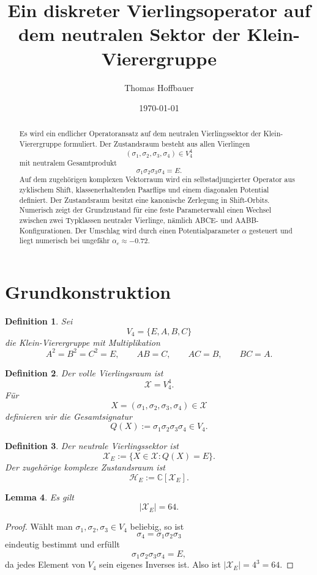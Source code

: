 \documentclass[11pt,a4paper]{article}
\title{Ein diskreter Vierlingsoperator auf dem neutralen Sektor der Klein-Vierergruppe}
\author{Thomas Hoffbauer}
\date{\today}
\newtheorem{definition}{Definition}[section]
\newtheorem{lemma}[definition]{Lemma}
\theoremstyle{remark}
\newcommand{\V}{V_4}
\newcommand{\X}{\mathcal X}
\newcommand{\XE}{\mathcal X_E}
\newcommand{\HE}{\mathcal H_E}
\begin{document}
	\maketitle
	
	\begin{abstract}
		Es wird ein endlicher Operatoransatz auf dem neutralen Vierlingssektor der Klein-Vierergruppe formuliert. Der Zustandsraum besteht aus allen Vierlingen
		\[
		(\sigma_1,\sigma_2,\sigma_3,\sigma_4)\in \V^4
		\]
		mit neutralem Gesamtprodukt
		\[
		\sigma_1\sigma_2\sigma_3\sigma_4=E.
		\]
		Auf dem zugehörigen komplexen Vektorraum wird ein selbstadjungierter Operator aus zyklischem Shift, klassenerhaltenden Paarflips und einem diagonalen Potential definiert. Der Zustandsraum besitzt eine kanonische Zerlegung in Shift-Orbits. Numerisch zeigt der Grundzustand für eine feste Parameterwahl einen Wechsel zwischen zwei Typklassen neutraler Vierlinge, nämlich ABCE- und AABB-Konfigurationen. Der Umschlag wird durch einen Potentialparameter \(\alpha\) gesteuert und liegt numerisch bei ungefähr \(\alpha_c\approx -0.72\).
	\end{abstract}
	
	\section{Grundkonstruktion}
	
	\begin{definition}
		Sei
		\[
		\V=\{E,A,B,C\}
		\]
		die Klein-Vierergruppe mit Multiplikation
		\[
		A^2=B^2=C^2=E,\qquad AB=C,\qquad AC=B,\qquad BC=A.
		\]
	\end{definition}
	
	\begin{definition}
		Der volle Vierlingsraum ist
		\[
		\X=\V^4.
		\]
		Für
		\[
		X=(\sigma_1,\sigma_2,\sigma_3,\sigma_4)\in \X
		\]
		definieren wir die Gesamtsignatur
		\[
		Q(X):=\sigma_1\sigma_2\sigma_3\sigma_4\in \V.
		\]
	\end{definition}
	
	\begin{definition}
		Der neutrale Vierlingssektor ist
		\[
		\XE:=\{X\in \X : Q(X)=E\}.
		\]
		Der zugehörige komplexe Zustandsraum ist
		\[
		\HE:=\mathbb C[\XE].
		\]
	\end{definition}
	
	\begin{lemma}
		Es gilt
		\[
		|\XE|=64.
		\]
	\end{lemma}
	
	\begin{proof}
		Wählt man \(\sigma_1,\sigma_2,\sigma_3\in \V\) beliebig, so ist
		\[
		\sigma_4=\sigma_1\sigma_2\sigma_3
		\]
		eindeutig bestimmt und erfüllt
		\[
		\sigma_1\sigma_2\sigma_3\sigma_4=E,
		\]
		da jedes Element von \(\V\) sein eigenes Inverses ist. Also ist \(|\XE|=4^3=64\).
	\end{proof}
	
\end{document}
